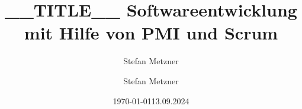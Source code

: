 \documentclass[
    12pt,
    titlepage,
    ngerman, %
    a4paper, %
    oneside, %
    index=totoc, %
]{article}
\title{ __TITLE__ }
\author{Stefan Metzner}
\date{\today}
\begin{document}
    \begin{titlepage}
        \title{Softwareentwicklung mit Hilfe von PMI und Scrum}
        \date{13.09.2024}
        \author{Stefan Metzner}
        \maketitle
    \end{titlepage}
    
    
    \newpage
    
    \tableofcontents
    \clearpage
    
    

    

    

    

    

    
    
\end{document}
